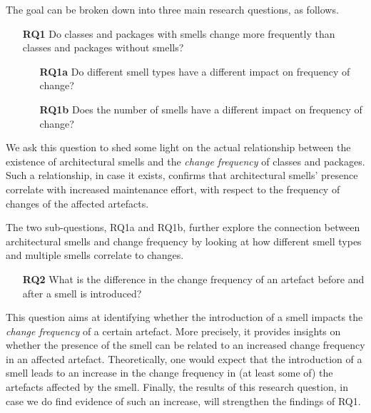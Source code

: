 The goal can be broken down into three main research questions, as follows.
\begin{itemize}
    \item[\textbf{RQ1}] Do classes and packages with smells change more frequently than classes and packages without smells?
    \begin{itemize}
        \item[\textbf{RQ1a}] Do different smell types have a different impact on frequency of change?
        \item[\textbf{RQ1b}] Does the number of smells have a different impact on frequency of change?
    \end{itemize} 
\end{itemize}
We ask this question to shed some light on the actual relationship between the existence of architectural smells and the \emph{change frequency} of classes and packages.
Such a relationship, in case it exists, confirms that architectural smells' presence correlate with increased maintenance effort, with respect to the frequency of changes of the affected artefacts.

The two sub-questions, RQ1a and RQ1b, further explore the connection between architectural smells and change frequency by looking at how different smell types and multiple smells correlate to changes.

\begin{itemize}
    \item[\textbf{RQ2}] What is the difference in the change frequency of an artefact before and after a smell is introduced?
\end{itemize}
This question aims at identifying whether the introduction of a smell impacts the \emph{change frequency} of a certain artefact.
More precisely, it provides insights on whether the presence of the smell can be related to an increased change frequency in an affected artefact.
Theoretically, one would expect that the introduction of a smell leads to an increase in the change frequency in (at least some of) the artefacts affected by the smell.
Finally, the results of this research question, in case we do find evidence of such an increase, will strengthen the findings of RQ1.

